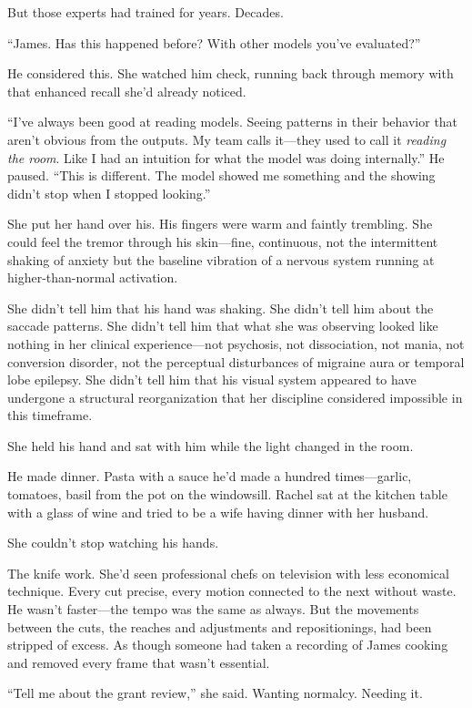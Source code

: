 But those experts had trained for years. Decades.

``James. Has this happened before? With other models you've evaluated?''

He considered this. She watched him check, running back through memory with that enhanced recall she'd already noticed.

``I've always been good at reading models. Seeing patterns in their behavior that aren't obvious from the outputs. My team calls it---they used to call it \textit{reading the room}. Like I had an intuition for what the model was doing internally.'' He paused. ``This is different. The model showed me something and the showing didn't stop when I stopped looking.''

She put her hand over his. His fingers were warm and faintly trembling. She could feel the tremor through his skin---fine, continuous, not the intermittent shaking of anxiety but the baseline vibration of a nervous system running at higher-than-normal activation.

She didn't tell him that his hand was shaking. She didn't tell him about the saccade patterns. She didn't tell him that what she was observing looked like nothing in her clinical experience---not psychosis, not dissociation, not mania, not conversion disorder, not the perceptual disturbances of migraine aura or temporal lobe epilepsy. She didn't tell him that his visual system appeared to have undergone a structural reorganization that her discipline considered impossible in this timeframe.

She held his hand and sat with him while the light changed in the room.

\bigskip

He made dinner. Pasta with a sauce he'd made a hundred times---garlic, tomatoes, basil from the pot on the windowsill. Rachel sat at the kitchen table with a glass of wine and tried to be a wife having dinner with her husband.

She couldn't stop watching his hands.

The knife work. She'd seen professional chefs on television with less economical technique. Every cut precise, every motion connected to the next without waste. He wasn't faster---the tempo was the same as always. But the movements between the cuts, the reaches and adjustments and repositionings, had been stripped of excess. As though someone had taken a recording of James cooking and removed every frame that wasn't essential.

``Tell me about the grant review,'' she said. Wanting normalcy. Needing it.

